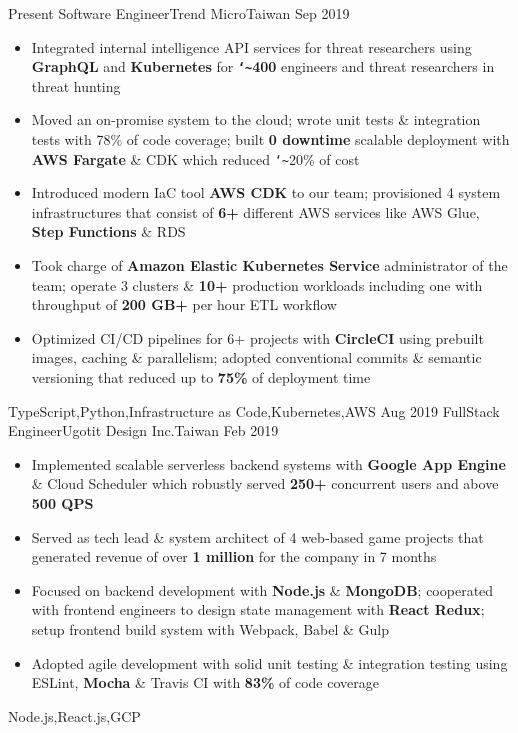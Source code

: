 \begin{experiences}
  \experience
    {Present}       {Software Engineer}{Trend Micro}{Taiwan}
    {Sep 2019}      {
                      \begin{itemize}
                        \item{Integrated internal intelligence API services for threat researchers using \textbf{GraphQL} and \textbf{Kubernetes} for \textbf{\texttt{\char`\~}400} engineers and threat researchers in threat hunting}
                        \item{Moved an on-promise system to the cloud; wrote unit tests \& integration tests with 78\% of code coverage; built \textbf{0 downtime} scalable deployment with \textbf{AWS Fargate} \& CDK which reduced \texttt{\char`\~}20\% of cost}
                        \item{Introduced modern IaC tool \textbf{AWS CDK} to our team; provisioned 4 system infrastructures that consist of \textbf{6+} different AWS services like AWS Glue, \textbf{Step Functions} \& RDS}
                        \item{Took charge of \textbf{Amazon Elastic Kubernetes Service} administrator of the team; operate 3 clusters \& \textbf{10+} production workloads including one with throughput of \textbf{200 GB+} per hour ETL workflow}
                        \item{Optimized CI/CD pipelines for 6+ projects with \textbf{CircleCI} using prebuilt images, caching \& parallelism; adopted conventional commits \& semantic versioning that reduced up to \textbf{75\%} of deployment time}
                      \end{itemize}
                    }
                    {TypeScript,Python,Infrastructure as Code,Kubernetes,AWS}
  \emptySeparator
  \experience
    {Aug 2019}      {FullStack Engineer}{Ugotit Design Inc.}{Taiwan}
    {Feb 2019}      {
                      \begin{itemize}
                        \item{Implemented scalable serverless backend systems with \textbf{Google App Engine} \& Cloud Scheduler which robustly served \textbf{250+} concurrent users and above \textbf{500 QPS}}
                        \item{Served as tech lead \& system architect of 4 web‐based game projects that generated revenue of over \textbf{1 million} for the company in 7 months}
                        \item{Focused on backend development with \textbf{Node.js} \& \textbf{MongoDB}; cooperated with frontend engineers to design state management with \textbf{React Redux}; setup frontend build system with Webpack, Babel \& Gulp}
                        \item{Adopted agile development with solid unit testing \& integration testing using ESLint, \textbf{Mocha} \& Travis CI with \textbf{83\%} of code coverage}
                      \end{itemize}
                    }
                    {Node.js,React.js,GCP}
\end{experiences}
